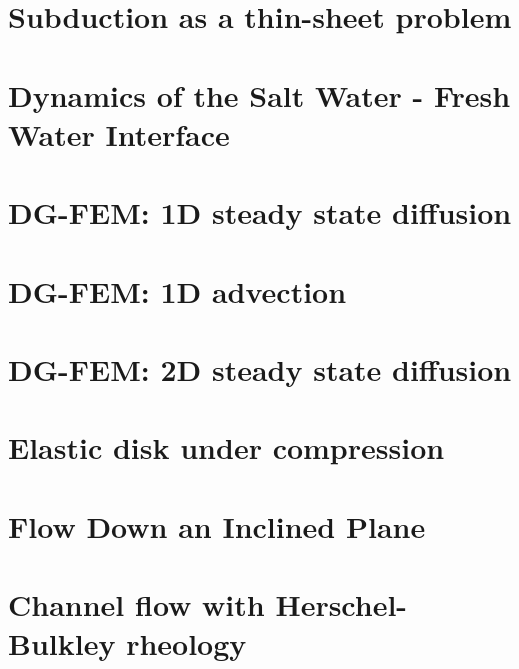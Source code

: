 \documentclass[a4paper,11pt]{report}
\begin{document}
\chapter{Subduction as a thin-sheet problem  \label{f55}} 

\chapter{Dynamics of the Salt Water - Fresh Water Interface \label{f56}} 

\chapter{DG-FEM: 1D steady state diffusion \label{f57}} 

\chapter{DG-FEM: 1D advection \label{f60}} 

\chapter{DG-FEM: 2D steady state diffusion \label{f79}}

\chapter{Elastic disk under compression \label{f58}} 

\chapter{Flow Down an Inclined Plane \label{f59}} 

\chapter{Channel flow with Herschel-Bulkley rheology \label{f61}} 
\end{document}

